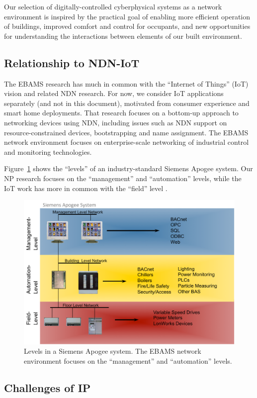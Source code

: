 Our selection of digitally-controlled cyberphysical systems  as a
network environment is inspired by the practical goal of enabling more 
efficient operation of buildings, improved comfort and control for occupants, 
and new opportunities for understanding the interactions between elements 
of our built environment. 

\subsection{Relationship to NDN-IoT}

The EBAMS research has much in common with the ``Internet of Things'' (IoT) vision and related NDN research.  For now, we consider IoT applications separately (and not in this document), motivated from consumer experience and smart home deployments.  That research focuses on a bottom-up approach to networking devices using NDN, including issues such as NDN support on resource-constrained devices, bootstrapping and name assignment.  The EBAMS network environment focuses on enterprise-scale networking of industrial control and monitoring technologies. 

Figure~\ref{fig:apogee-levels} shows the ``levels'' of an industry-standard Siemens Apogee system.  Our NP research focuses on the ``management'' and ``automation'' levels, while the IoT work has more in common with the ``field'' level .

\begin{figure}
\begin{center}
\vskip -12pt
\includegraphics[width=.6\textwidth]{figures/siemens-apogee-levels}
\vskip -5pt
\caption{{Levels in a Siemens Apogee system. The EBAMS network environment focuses on the ``management'' and ``automation'' levels.}}
\label{fig:apogee-levels}
\end{center}
\end{figure}

\subsection{Challenges of IP}

